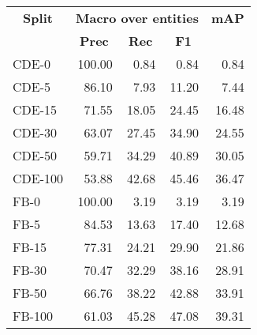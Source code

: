 \begin{tabular}{| l | r | r | r | r |}
    \hline

    \multicolumn{1}{|c|}{\textbf{Split}} &
    \multicolumn{3}{|c|}{\textbf{Macro over entities}} &
    \multicolumn{1}{|c|}{\textbf{mAP}} \\

    \multicolumn{1}{|c|}{} &
    \multicolumn{1}{|c|}{\textbf{Prec}} &
    \multicolumn{1}{|c|}{\textbf{Rec}} &
    \multicolumn{1}{|c|}{\textbf{F1}} &
    \multicolumn{1}{|c|}{} \\

    \hline \hline

    CDE-0   & 100.00 &  0.84 &  0.84 &  0.84 \\
    CDE-5   &  86.10 &  7.93 & 11.20 &  7.44 \\
    CDE-15  &  71.55 & 18.05 & 24.45 & 16.48 \\
    CDE-30  &  63.07 & 27.45 & 34.90 & 24.55 \\
    CDE-50  &  59.71 & 34.29 & 40.89 & 30.05 \\
    CDE-100 &  53.88 & 42.68 & 45.46 & 36.47 \\

    \hline

    FB-0    & 100.00 &  3.19 &  3.19 &  3.19 \\
    FB-5    &  84.53 & 13.63 & 17.40 & 12.68 \\
    FB-15   &  77.31 & 24.21 & 29.90 & 21.86 \\
    FB-30   &  70.47 & 32.29 & 38.16 & 28.91 \\
    FB-50   &  66.76 & 38.22 & 42.88 & 33.91 \\
    FB-100  &  61.03 & 45.28 & 47.08 & 39.31 \\

    \hline
\end{tabular}
